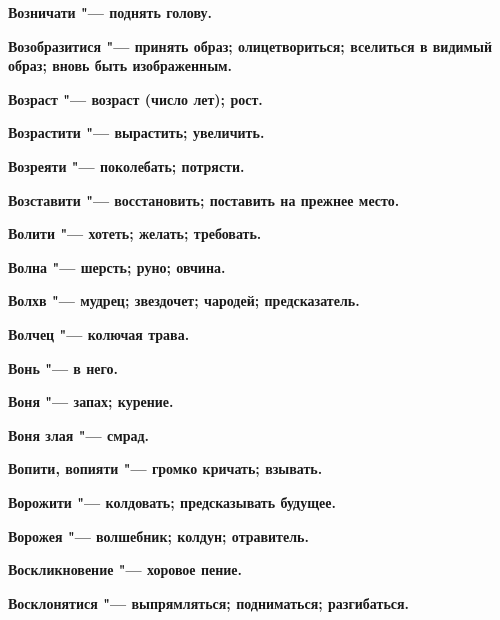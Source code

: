 \begin{mymulticols}{2}
\bfseries Возничати\normalfont{} "--- поднять голову. 




\bfseries Возобразитися\normalfont{} "--- принять образ; олицетвориться; вселиться в видимый образ; вновь быть изображенным. 




\bfseries Возраст\normalfont{} "--- возраст (число лет); рост. 




\bfseries Возрастити\normalfont{} "--- вырастить; увеличить. 




\bfseries Возреяти\normalfont{} "--- поколебать; потрясти. 




\bfseries Возставити\normalfont{} "--- восстановить; поставить на прежнее место. 




\bfseries Волити\normalfont{} "--- хотеть; желать; требовать. 




\bfseries Волна\normalfont{} "--- шерсть; руно; овчина. 




\bfseries Волхв\normalfont{} "--- мудрец; звездочет; чародей; предсказатель. 




\bfseries Волчец\normalfont{} "--- колючая трава. 




\bfseries Вонь\normalfont{} "--- в него. 




\bfseries Воня\normalfont{} "--- запах; курение. 




\bfseries Воня злая\normalfont{} "--- смрад. 




\bfseries Вопити, вопияти\normalfont{} "--- громко кричать; взывать. 




\bfseries Ворожити\normalfont{} "--- колдовать; предсказывать будущее. 




\bfseries Ворожея\normalfont{} "--- волшебник; колдун; отравитель. 




\bfseries Воскликновение\normalfont{} "--- хоровое пение. 




\bfseries Восклонятися\normalfont{} "--- выпрямляться; подниматься; разгибаться. 





\end{mymulticols}

